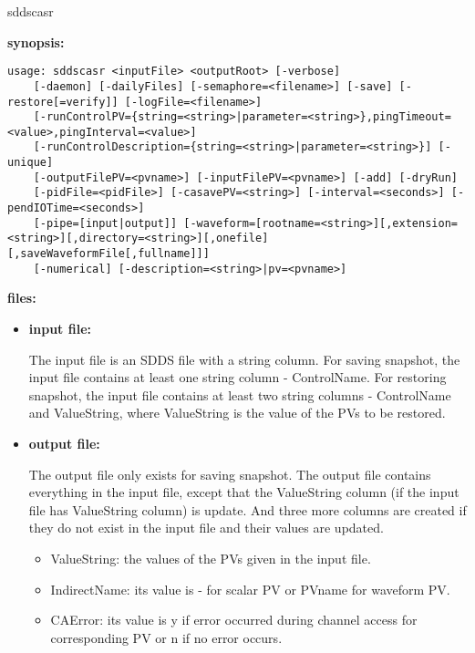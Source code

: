 \begin{sddsprog}{sddscasr}
\item \textbf{synopsis:}
\begin{verbatim}
usage: sddscasr <inputFile> <outputRoot> [-verbose]
    [-daemon] [-dailyFiles] [-semaphore=<filename>] [-save] [-restore[=verify]] [-logFile=<filename>]
    [-runControlPV={string=<string>|parameter=<string>},pingTimeout=<value>,pingInterval=<value>]
    [-runControlDescription={string=<string>|parameter=<string>}] [-unique]
    [-outputFilePV=<pvname>] [-inputFilePV=<pvname>] [-add] [-dryRun]
    [-pidFile=<pidFile>] [-casavePV=<string>] [-interval=<seconds>] [-pendIOTime=<seconds>]
    [-pipe=[input|output]] [-waveform=[rootname=<string>][,extension=<string>][,directory=<string>][,onefile][,saveWaveformFile[,fullname]]]
    [-numerical] [-description=<string>|pv=<pvname>]
\end{verbatim}
\item \textbf{files:}
\begin{itemize}
  \item \textbf{input file:} \par
The input file is an SDDS file with a string column. For saving snapshot, the input file
contains at least one string column - ControlName. For restoring snapshot, the input file
contains at least two string columns - ControlName and ValueString, where ValueString is the
value of the PVs to be restored.
  \item \textbf{output file:} \par
The output file only exists for saving snapshot. The output file contains everything in the input
file, except that the ValueString column (if the input file has ValueString column) is update. And
three more columns are created if they do not exist in the input file and their values are updated.
  \begin{itemize}
    \item {ValueString}: the values of the PVs given in the input file.
    \item {IndirectName}: its value  is - for scalar PV or PVname for waveform PV.
    \item {CAError}: its value is y if error occurred during channel access for
corresponding PV or n if no error occurs.
  \end{itemize}
\end{itemize}


\end{sddsprog}
